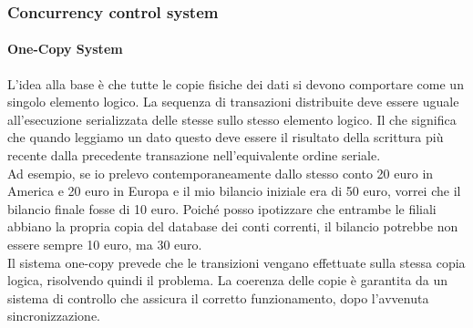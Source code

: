 \documentclass{article}
\begin{document}
		\subsubsection{Concurrency control system}
		\paragraph{One-Copy System} L'idea alla base è che tutte le copie fisiche dei dati si devono comportare come un singolo elemento logico. La sequenza di transazioni distribuite deve essere uguale all'esecuzione serializzata delle stesse sullo stesso elemento logico. Il che significa che quando leggiamo un dato questo deve essere il risultato della scrittura più recente dalla precedente transazione nell'equivalente ordine seriale.\\
		
		Ad esempio, se io prelevo contemporaneamente dallo stesso conto 20 euro in America e 20 euro in Europa e il mio bilancio iniziale era di 50 euro, vorrei che il bilancio finale fosse di 10 euro. Poiché posso ipotizzare che entrambe le filiali abbiano la propria copia del database dei conti correnti, il bilancio potrebbe non essere sempre 10 euro, ma 30 euro.\\		
		
		Il sistema one-copy prevede che le transizioni vengano effettuate sulla stessa copia logica, risolvendo quindi il problema. 
		La coerenza delle copie è garantita da un sistema di controllo che assicura il corretto funzionamento, dopo l'avvenuta sincronizzazione.	
		
\end{document}
